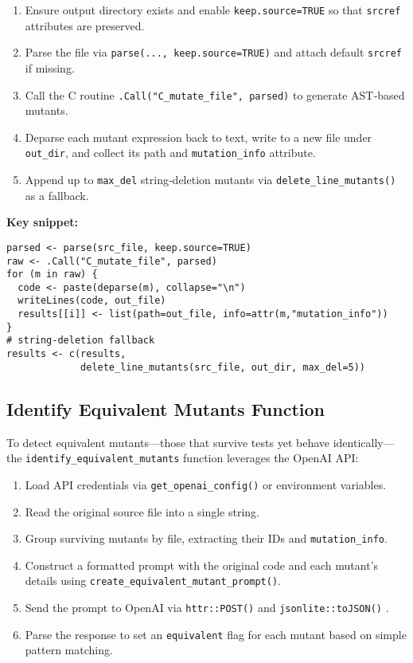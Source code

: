 \begin{enumerate}
  \item Ensure output directory exists and enable \texttt{keep.source=TRUE} so that \texttt{srcref} attributes are preserved.  
  \item Parse the file via \texttt{parse(..., keep.source=TRUE)} and attach default \texttt{srcref} if missing.  
  \item Call the C routine \texttt{.Call("C\_mutate\_file", parsed)} to generate AST‐based mutants.  
  \item Deparse each mutant expression back to text, write to a new file under \texttt{out\_dir}, and collect its path and \texttt{mutation\_info} attribute.  
  \item Append up to \texttt{max\_del} string‐deletion mutants via \texttt{delete\_line\_mutants()} as a fallback.
\end{enumerate}

\medskip
\noindent\textbf{Key snippet:}
\begin{verbatim}
parsed <- parse(src_file, keep.source=TRUE)
raw <- .Call("C_mutate_file", parsed)
for (m in raw) {
  code <- paste(deparse(m), collapse="\n")
  writeLines(code, out_file)
  results[[i]] <- list(path=out_file, info=attr(m,"mutation_info"))
}
# string‐deletion fallback
results <- c(results,
             delete_line_mutants(src_file, out_dir, max_del=5))
\end{verbatim}

\subsection{Identify Equivalent Mutants Function}

To detect equivalent mutants—those that survive tests yet behave identically—the \texttt{identify\_equivalent\_mutants} function leverages the OpenAI API:

\begin{enumerate}
  \item Load API credentials via \texttt{get\_openai\_config()} or environment variables.  
  \item Read the original source file into a single string.  
  \item Group surviving mutants by file, extracting their IDs and \texttt{mutation\_info}.  
  \item Construct a formatted prompt with the original code and each mutant’s details using \texttt{create\_equivalent\_mutant\_prompt()}.  
  \item Send the prompt to OpenAI via \texttt{httr::POST()} and \texttt{jsonlite::toJSON()} \cite{wickham2011httr,ooms2014jsonlite,openai2023api}.  
  \item Parse the response to set an \texttt{equivalent} flag for each mutant based on simple pattern matching.
\end{enumerate}

